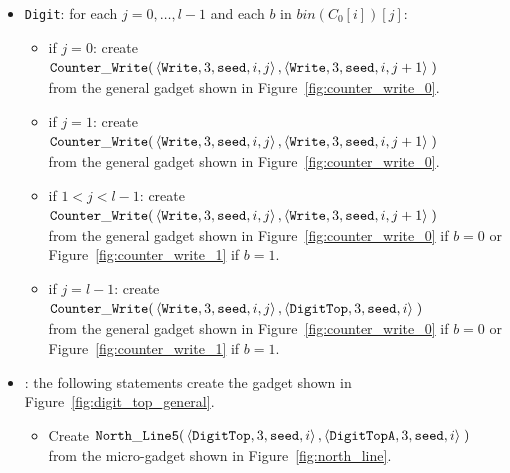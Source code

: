 \begin{itemize}
    \item {\tt Digit}: for each $j=0,\ldots,l-1$ and each $b$ in $bin(C_0[i])[j]$:
    \begin{itemize}
        \item if $j = 0$: create
        $\begin{aligned}[t]
            {\tt Counter\_Write}(&\left\langle {\tt Write}, 3, {\tt seed}, i, j \right\rangle, \left\langle {\tt Write}, 3, {\tt seed}, i, j + 1 \right\rangle \;)
        \end{aligned}$\\from the general gadget shown in Figure~\ref{fig:counter_write_0}.

        \item if $j = 1$: create
        $\begin{aligned}[t]
            {\tt Counter\_Write}(&\left\langle {\tt Write}, 3, {\tt seed}, i, j \right\rangle, \left\langle {\tt Write}, 3, {\tt seed}, i, j + 1 \right\rangle \;)
        \end{aligned}$\\from the general gadget shown in Figure~\ref{fig:counter_write_0}.

        \item if $1 < j < l-1$: create
        $\begin{aligned}[t]
            {\tt Counter\_Write}(&\left\langle {\tt Write}, 3, {\tt seed}, i, j \right\rangle, \left\langle {\tt Write}, 3, {\tt seed}, i, j + 1 \right\rangle \;)
        \end{aligned}$\\from the general gadget shown in Figure~\ref{fig:counter_write_0} if $b = 0$ or Figure~\ref{fig:counter_write_1} if $b = 1$.

        \item if $j = l-1$: create
        $\begin{aligned}[t]
            {\tt Counter\_Write}(&\left\langle {\tt Write}, 3, {\tt seed}, i, j \right\rangle, \left\langle {\tt DigitTop}, 3, {\tt seed}, i \right\rangle \;)
        \end{aligned}$\\from the general gadget shown in Figure~\ref{fig:counter_write_0} if $b = 0$ or Figure~\ref{fig:counter_write_1} if $b = 1$.
    \end{itemize}

    \item {\dtop}: the following statements create the gadget shown in Figure~\ref{fig:digit_top_general}.
    \begin{itemize}
        \item Create
        $\begin{aligned}[t]
            {\tt North\_Line5}(&\left\langle {\tt DigitTop},  3, {\tt seed}, i \right\rangle,
                                \left\langle {\tt DigitTopA}, 3, {\tt seed}, i \right\rangle \;)
        \end{aligned}$\\from the micro-gadget shown in Figure~\ref{fig:north_line}.


\end{itemize}
\end{itemize}
